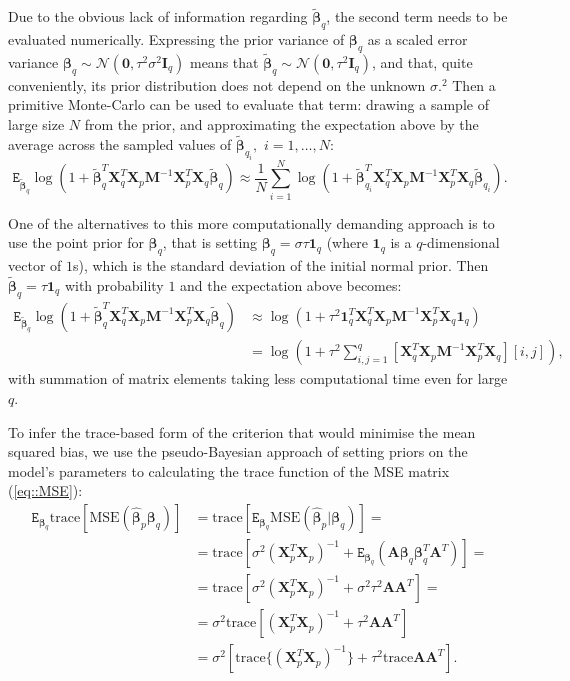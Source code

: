 Due to the obvious lack of information regarding $\bm{\tilde{\beta}}_q$, the second term needs to be evaluated numerically. Expressing the prior variance of $\bm{\beta}_q$ as a scaled error variance $\bm{\beta}_q \sim \mathcal{N}(\bm{0},\tau^{2}\sigma^{2}\bm{I}_{q})$ means that $\bm{\tilde{\beta}}_q \sim \mathcal{N}(\bm{0},\tau^{2}\bm{I}_{q})$, and that, quite conveniently, its prior distribution does not depend on the unknown $\sigma.^2$ Then a primitive Monte-Carlo can be used to evaluate that term: drawing a sample of large size $N$ from the prior, and approximating the expectation above by the average across the sampled values of $\bm{\tilde{\beta}}_{q_i},$ $i=1,\dots, N$:
\begin{equation*}
\mathtt{E}_{\bm{\tilde{\beta}}_q}\log(1+\bm{\tilde{\beta}}_q^T\bm{X}_q^{T}\bm{X}_p\bm{M}^{-1}\bm{X}_p^{T}\bm{X}_q\bm{\tilde{\beta}}_q) \approx \frac{1}{N}\sum_{i=1}^{N}\log(1+\bm{\tilde{\beta}}_{q_i}^T\bm{X}_q^{T}\bm{X}_p\bm{M}^{-1}\bm{X}_p^{T}\bm{X}_q\bm{\tilde{\beta}}_{q_i}).
\end{equation*} 

One of the alternatives to this more computationally demanding approach is to use the point prior for $\bm{\beta}_q$, that is setting  $\bm{\beta}_q=\sigma\tau\bm{1}_q$ (where $\bm{1}_q$ is a $q$-dimensional vector of $1$s), which is the standard deviation  of the initial normal prior. Then $\bm{\tilde{\beta}}_q = \tau\bm{1}_q$ with probability $1$ and the expectation above becomes:
\begin{align*}
\mathtt{E}_{\bm{\tilde{\beta}}_q}\log(1+\bm{\tilde{\beta}}_q^T\bm{X}_q^{T}\bm{X}_p\bm{M}^{-1}\bm{X}_p^{T}\bm{X}_q\bm{\tilde{\beta}}_q)  &\approx \log(1+\tau^2\bm{1}^T_q\bm{X}_q^{T}\bm{X}_p\bm{M}^{-1}\bm{X}_p^{T}\bm{X}_q\bm{1}_q) \\&=\log(1+\tau^2\sum_{i,j=1}^{q}[\bm{X}_q^{T}\bm{X}_p\bm{M}^{-1}\bm{X}_p^{T}\bm{X}_q][i,j]),
\end{align*}
with summation of matrix elements taking less computational time even for large $q$. 
 
To infer the trace-based form of the criterion that would minimise the mean squared bias, we use the pseudo-Bayesian approach of setting priors on the model's parameters  to calculating the trace function of the MSE matrix (\ref{eq::MSE}): 
\begin{align*}
\mathtt{E}_{\bm{\beta}_q}\mbox{trace}[\mbox{MSE}(\bm{\hat{\beta}}_p\bm{\beta}_q)]&=\mbox{trace}[\mathtt{E}_{\bm{\beta}_q}\mbox{MSE}(\bm{\hat{\beta}}_p|\bm{\beta}_q)]=\\&=\mbox{trace}[\sigma^2(\bm{X}_p^{T}\bm{X}_p)^{-1} + \mathtt{E}_{\bm{\beta}_q}(\bm{A}\bm{\beta}_q\bm{\beta}_q^T\bm{A}^T)]=\\&=\mbox{trace}[\sigma^2(\bm{X}_p^{T}\bm{X}_p)^{-1}+\sigma^2\tau^2\bm{A}\bm{A}^T]=\\&=\sigma^2\mbox{trace}[(\bm{X}_p^{T}\bm{X}_p)^{-1}+\tau^2\bm{A}\bm{A}^T]\\&=\sigma^2[\mbox{trace}\{(\bm{X}_p^{T}\bm{X}_p)^{-1}\}+\tau^2\mbox{trace}\bm{A}\bm{A}^T].
\end{align*}

